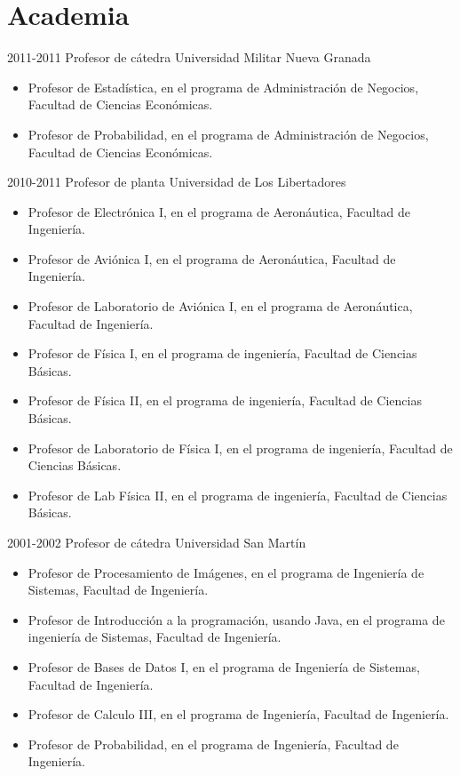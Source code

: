 \section{Academia}

\begin{entrylist}
  \entry
	{2011-2011}
	{Profesor de cátedra}
	{Universidad Militar Nueva Granada}
	{\begin{itemize}
	    \item Profesor de Estadística, en el programa de Administración de Negocios, Facultad
		    de Ciencias Económicas.
            \item Profesor de Probabilidad, en el programa de Administración de Negocios, Facultad
		    de Ciencias Económicas.
	\end{itemize}}
  \entry
	{2010-2011}
	{Profesor de planta}
	{Universidad de Los Libertadores}
	{\begin{itemize}
              \item Profesor de Electrónica I, en el programa de Aeronáutica, Facultad de
		      Ingeniería.
              \item Profesor de Aviónica I, en el programa de Aeronáutica, Facultad de
		      Ingeniería.
              \item Profesor de Laboratorio de Aviónica I, en el programa de Aeronáutica, Facultad de
		      Ingeniería.
              \item Profesor de Física I, en el programa de ingeniería, Facultad de
		      Ciencias Básicas.
              \item Profesor de Física II, en el programa de ingeniería, Facultad de
		      Ciencias Básicas.
              \item Profesor de Laboratorio de Física I, en el programa de ingeniería, Facultad de
		      Ciencias Básicas.
              \item Profesor de Lab Física II, en el programa de ingeniería, Facultad de
		      Ciencias Básicas.
	\end{itemize}}

  \entry
        {2001-2002}
	{Profesor de cátedra}
	{Universidad San Martín}
	{\begin{itemize}
              \item Profesor de Procesamiento de Imágenes, en el programa de Ingeniería de Sistemas,
Facultad de Ingeniería.
              \item Profesor de Introducción a la programación, usando Java, en el programa de
		      ingeniería de Sistemas, Facultad de Ingeniería.
              \item Profesor de Bases de Datos I, en el programa de Ingeniería de Sistemas, Facultad
		      de Ingeniería.
              \item Profesor de Calculo III, en el programa de Ingeniería, Facultad de Ingeniería.
              \item Profesor de Probabilidad, en el programa de Ingeniería, Facultad de Ingeniería.
	\end{itemize}}


\end{entrylist}
